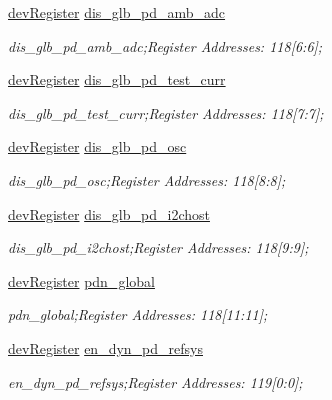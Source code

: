 \begin{DoxyCompactItemize}
\mbox{\hyperlink{classdev_register}{dev\+Register}} \mbox{\hyperlink{class_o_p_t3101_registers_a634e303dd3d5ed27db06ec313f65a903}{dis\+\_\+glb\+\_\+pd\+\_\+amb\+\_\+adc}}
\begin{DoxyCompactList}\small\item\em dis\+\_\+glb\+\_\+pd\+\_\+amb\+\_\+adc;Register Addresses\+: 118\mbox{[}6\+:6\mbox{]}; \end{DoxyCompactList}\item 
\mbox{\hyperlink{classdev_register}{dev\+Register}} \mbox{\hyperlink{class_o_p_t3101_registers_ac6ca05692ed3228b420198d2d2d41764}{dis\+\_\+glb\+\_\+pd\+\_\+test\+\_\+curr}}
\begin{DoxyCompactList}\small\item\em dis\+\_\+glb\+\_\+pd\+\_\+test\+\_\+curr;Register Addresses\+: 118\mbox{[}7\+:7\mbox{]}; \end{DoxyCompactList}\item 
\mbox{\hyperlink{classdev_register}{dev\+Register}} \mbox{\hyperlink{class_o_p_t3101_registers_afb003e0de106bae66235b7bfce615880}{dis\+\_\+glb\+\_\+pd\+\_\+osc}}
\begin{DoxyCompactList}\small\item\em dis\+\_\+glb\+\_\+pd\+\_\+osc;Register Addresses\+: 118\mbox{[}8\+:8\mbox{]}; \end{DoxyCompactList}\item 
\mbox{\hyperlink{classdev_register}{dev\+Register}} \mbox{\hyperlink{class_o_p_t3101_registers_ad0168cb093e6daba316dd980114dba22}{dis\+\_\+glb\+\_\+pd\+\_\+i2chost}}
\begin{DoxyCompactList}\small\item\em dis\+\_\+glb\+\_\+pd\+\_\+i2chost;Register Addresses\+: 118\mbox{[}9\+:9\mbox{]}; \end{DoxyCompactList}\item 
\mbox{\hyperlink{classdev_register}{dev\+Register}} \mbox{\hyperlink{class_o_p_t3101_registers_a3e71677cefd8061611120b0aadb753da}{pdn\+\_\+global}}
\begin{DoxyCompactList}\small\item\em pdn\+\_\+global;Register Addresses\+: 118\mbox{[}11\+:11\mbox{]}; \end{DoxyCompactList}\item 
\mbox{\hyperlink{classdev_register}{dev\+Register}} \mbox{\hyperlink{class_o_p_t3101_registers_ae5308a2b279a1c5c9b9e34da5a49bf06}{en\+\_\+dyn\+\_\+pd\+\_\+refsys}}
\begin{DoxyCompactList}\small\item\em en\+\_\+dyn\+\_\+pd\+\_\+refsys;Register Addresses\+: 119\mbox{[}0\+:0\mbox{]}; \end{DoxyCompactList}\item 

\end{DoxyCompactItemize}
